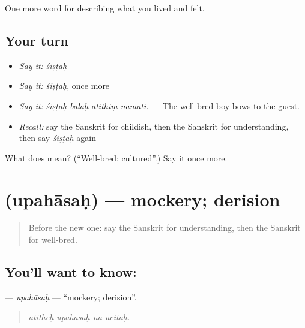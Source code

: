 \begin{grammarlens}[title={What you've built}]
One more word for describing what you lived and felt.
\end{grammarlens}

\subsection*{Your turn}
\begin{itemize}
\raggedright
  \item \emph{Say it:} \emph{śiṣṭaḥ}
  \item \emph{Say it:} \emph{śiṣṭaḥ}, once more
  \item \emph{Say it:} \emph{śiṣṭaḥ bālaḥ atithiṃ namati.} — The well-bred boy bows to the guest.
  \item \emph{Recall:} say the Sanskrit for childish, then the Sanskrit for understanding, then say \emph{śiṣṭaḥ} again
\end{itemize}

\begin{tcolorbox}[breakable,colback=teal!4,colframe=teal!35!black,title={Before you move on}]
What does  mean? (\textquotedblleft{}Well-bred; cultured\textquotedblright{}.) Say it once more.
\end{tcolorbox}
\section[\texorpdfstring{\sk{उपहासः} (upahāsaḥ)}{उपहासः (upahāsaḥ)}]{ (upahāsaḥ) — mockery; derision}

\label{lesson:SA-C467-upahasah}



\begin{quote}
Before the new one: say the Sanskrit for understanding, then the Sanskrit for well-bred.
\end{quote}

\subsection*{You'll want to know: }
\textbf{} — \emph{upahāsaḥ} — \textquotedblleft{}mockery; derision\textquotedblright{}.

\begin{quote}
   
\end{quote}

\begin{quote}
\emph{atitheḥ upahāsaḥ na ucitaḥ.}
\end{quote}

